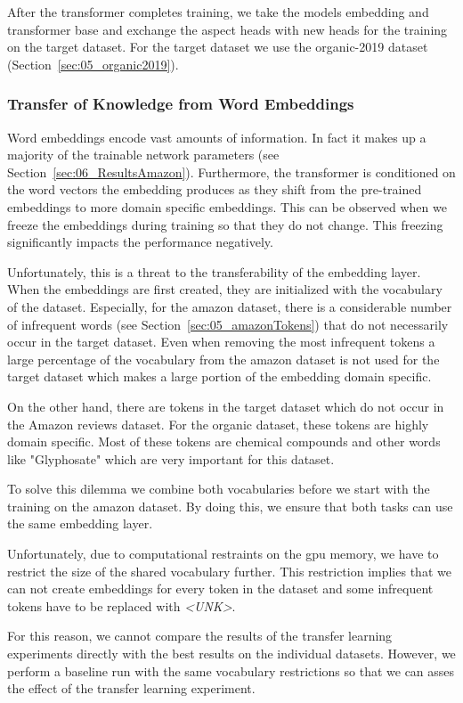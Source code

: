 After the transformer completes training, we take the models embedding and transformer base and exchange the aspect heads with new heads for the training on the target dataset. For the target dataset we use  the organic-2019 dataset {(Section~\ref{sec:05_organic2019})}.
\bigskip

\subsubsection*{Transfer of Knowledge from Word Embeddings}

Word embeddings encode vast amounts of information. In fact it makes up a majority of the trainable network parameters {(see Section~\ref{sec:06_ResultsAmazon})}. Furthermore, the transformer is conditioned on the word vectors the embedding produces as they shift from the pre-trained embeddings to more domain specific embeddings. This can be observed when we freeze the embeddings during training so that they do not change. This freezing significantly impacts the performance negatively.
\medskip

Unfortunately, this is a threat to the transferability of the embedding layer. When the embeddings are first created, they are initialized with the vocabulary of the dataset. Especially, for the amazon dataset, there is a considerable number of infrequent words {(see Section~\ref{sec:05_amazonTokens})} that do not necessarily occur in the target dataset. Even when removing the most infrequent tokens a large percentage of the vocabulary from the amazon dataset is not used for the target dataset which makes a large portion of the embedding domain specific. 
\medskip

On the other hand, there are tokens in the target dataset which do not occur in the Amazon reviews dataset. For the organic dataset, these tokens are highly domain specific. Most of these tokens are chemical compounds and other words like "Glyphosate" which are very important for this dataset.
\medskip

To solve this dilemma we combine both vocabularies before we start with the training on the amazon dataset. By doing this, we ensure that both tasks can use the same embedding layer. 

Unfortunately, due to computational restraints on the \gls{gpu} memory, we have to restrict the size of the shared vocabulary further. This restriction implies that we can not create embeddings for every token in the dataset and some infrequent tokens have to be replaced with \textit{<UNK>}.
\medskip

For this reason, we cannot compare the results of the transfer learning experiments directly with the best results on the individual datasets. However, we perform a baseline run with the same vocabulary restrictions so that we can asses the effect of the transfer learning experiment.